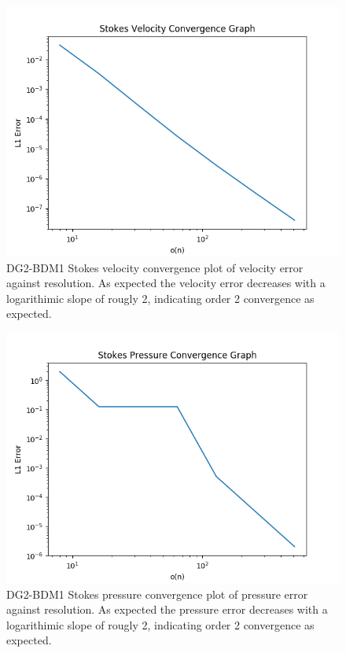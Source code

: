 \documentclass[11pt,twoside,a4paper]{article}
\begin{document}
\begin{figure}
  \includegraphics[width=\linewidth]{stokes_convergence_dbc0.png}
  \caption{DG2-BDM1 Stokes velocity convergence plot of velocity error against resolution. As expected the velocity error decreases with a logarithimic slope of rougly 2, indicating order 2 convergence as expected.}
\end{figure}

\begin{figure}
\includegraphics[width=\linewidth]{stokes_pressure_convergence_dbc0.png}
  \caption{DG2-BDM1 Stokes pressure convergence plot of pressure error against resolution. As expected the pressure error decreases with a logarithimic slope of rougly 2, indicating order 2 convergence as expected.}
\end{figure}
\end{document}
